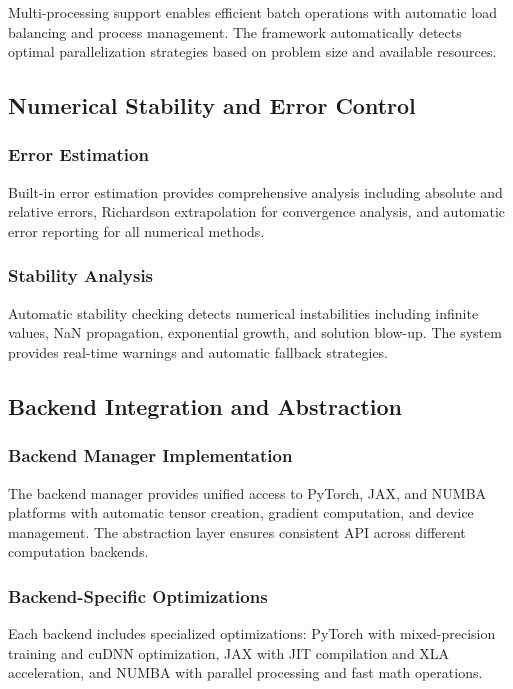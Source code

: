 Multi-processing support enables efficient batch operations with automatic load balancing and process management. The framework automatically detects optimal parallelization strategies based on problem size and available resources.

\subsection{Numerical Stability and Error Control}

\subsubsection{Error Estimation}

Built-in error estimation provides comprehensive analysis including absolute and relative errors, Richardson extrapolation for convergence analysis, and automatic error reporting for all numerical methods.

\subsubsection{Stability Analysis}

Automatic stability checking detects numerical instabilities including infinite values, NaN propagation, exponential growth, and solution blow-up. The system provides real-time warnings and automatic fallback strategies.

\subsection{Backend Integration and Abstraction}

\subsubsection{Backend Manager Implementation}

The backend manager provides unified access to PyTorch, JAX, and NUMBA platforms with automatic tensor creation, gradient computation, and device management. The abstraction layer ensures consistent API across different computation backends.

\subsubsection{Backend-Specific Optimizations}

Each backend includes specialized optimizations: PyTorch with mixed-precision training and cuDNN optimization, JAX with JIT compilation and XLA acceleration, and NUMBA with parallel processing and fast math operations.

